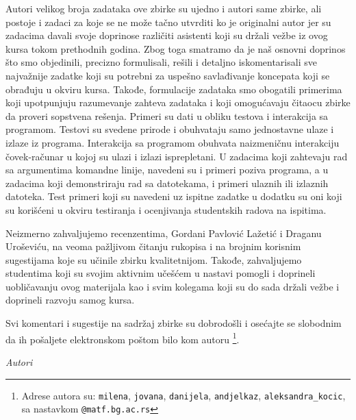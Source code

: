 Autori velikog broja zadataka ove zbirke su ujedno i autori same zbirke, ali postoje 
i zadaci za koje se ne može tačno utvrditi ko je originalni autor jer su zadacima 
davali svoje doprinose različiti asistenti koji su držali vežbe iz ovog kursa 
tokom prethodnih godina. Zbog toga smatramo da je naš osnovni doprinos 
što smo objedinili, precizno formulisali, rešili i detaljno iskomentarisali 
sve najvažnije zadatke koji su potrebni za uspešno savlađivanje koncepata 
koji se obrađuju u okviru kursa. Takođe, formulacije zadataka smo obogatili
primerima koji upotpunjuju razumevanje zahteva zadataka i koji omogućavaju
čitaocu zbirke da proveri sopstvena rešenja. Primeri su dati u obliku 
testova i interakcija sa programom. Testovi su svedene prirode i obuhvataju 
samo jednostavne ulaze i izlaze iz programa. Interakcija sa programom obuhvata 
naizmeničnu interakciju čovek-računar u kojoj su ulazi i izlazi isprepletani. 
U zadacima koji zahtevaju rad sa argumentima komandne linije, navedeni su i primeri poziva programa, a u zadacima koji demonstriraju rad sa datotekama, i primeri ulaznih ili izlaznih datoteka. Test primeri koji su navedeni uz ispitne zadatke u dodatku su oni koji su korišćeni u okviru testiranja i ocenjivanja studentskih radova na ispitima.

Neizmerno zahvaljujemo recenzentima, Gordani Pavlović Lažetić i Draganu Uroševiću, na veoma pažljivom čitanju rukopisa i na brojnim korisnim sugestijama koje su učinile zbirku kvalitetnijom. Takođe, zahvaljujemo studentima koji su svojim aktivnim učešćem u nastavi pomogli i doprineli uobličavanju ovog materijala kao i svim kolegama koji su do sada držali vežbe i doprineli razvoju samog kursa. 

Svi komentari i sugestije na sadržaj zbirke su dobrodošli i osećajte se slobodnim da ih pošaljete elektronskom poštom bilo kom autoru \footnote{Adrese autora su: \texttt{milena}, \texttt{jovana}, \texttt{danijela}, \texttt{andjelkaz}, \texttt{aleksandra\_kocic}, sa nastavkom \texttt{@matf.bg.ac.rs}}. 


\bigskip


\bigskip

\begin{flushright}
{\em Autori}
\end{flushright}
